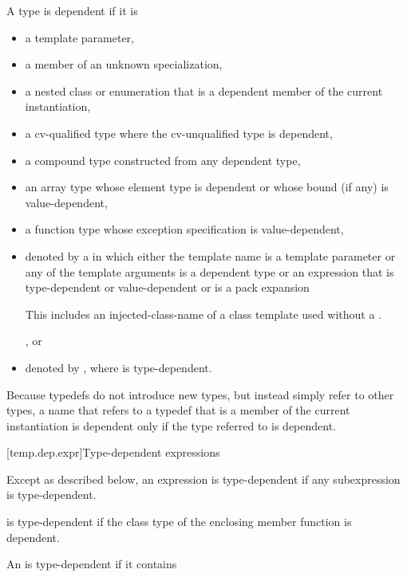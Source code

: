 \pnum
A type is dependent if it is
\begin{itemize}
\item
a template parameter,
\item
a member of an unknown specialization,
\item
a nested class or enumeration that is a dependent member of the current
instantiation,
\item
a cv-qualified type where the cv-unqualified type is dependent,
\item
a compound type constructed from any dependent type,
\item
an array type whose element type is dependent or whose
bound (if any) is value-dependent,
\item
a function type whose exception specification is value-dependent,
\item
denoted by a 
in which either the template name is a template parameter or any of the
template arguments is a dependent type or an expression that is type-dependent
or value-dependent or is a pack expansion
\begin{note}
This includes an injected-class-name of a class template
used without a .
\end{note}, or
\item denoted by \tcode{)},
where  is type-dependent.
\end{itemize}

\pnum
\begin{note}
Because typedefs do not introduce new types, but
instead simply refer to other types, a name that refers to a
typedef that is a member of the current instantiation is dependent
only if the type referred to is dependent.
\end{note}

[temp.dep.expr]{Type-dependent expressions}

\pnum
Except as described below, an expression is type-dependent if any
subexpression is type-dependent.

\pnum
{}
is type-dependent if the class type of the enclosing member function is
dependent.

\pnum
An
is type-dependent if it contains

